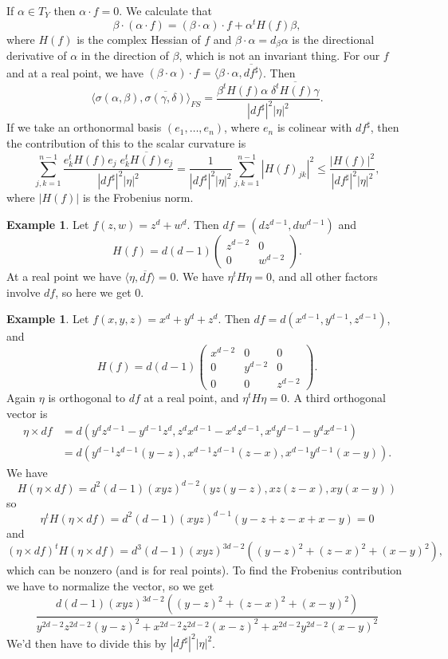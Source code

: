 \documentclass[11pt]{article}
\theoremstyle{definition}
\newtheorem{exam}[theo]{Example}
\def\ov#1{\overline{#1}}
\begin{document}
If $\alpha \in T_{Y}$ then $\alpha \cdot f = 0$. We calculate that
\[
  \beta \cdot (\alpha \cdot f)
  = (\beta \cdot \alpha) \cdot f
  + \alpha^{t} H(f) \beta,
\]
where $H(f)$ is the complex Hessian of $f$ and
$\beta \cdot \alpha = d_{\beta}\alpha$ is the directional derivative of $\alpha$
in the direction of $\beta$, which is not an invariant thing.
For our $f$ and at a real point, we have $(\beta \cdot \alpha) \cdot f = \langle \beta \cdot \alpha, \ov{df^{\sharp}} \rangle$.
Then
\[
  \langle \sigma(\alpha, \beta), \ov{\sigma(\gamma, \delta)} \rangle_{FS}
  = \frac{\beta^{t}H(f)\alpha \; \ov{\delta^{t}H(f)\gamma}}
  {|df^{\sharp}|^{2}|\eta|^{2}}.
\]
If we take an orthonormal basis $(e_{1}, \ldots, e_{n})$, where $e_{n}$ is colinear with $df^{\sharp}$, then the contribution of this to the scalar curvature is
\[
  \sum_{j,k=1}^{n-1} \frac{e_{k}^{t}H(f)e_{j} \; \ov{e_{k}^{t}H(f)e_{j}}}
  {|df^{\sharp}|^{2}|\eta|^{2}}
 = \frac{1}{|df^{\sharp}|^{2}|\eta|^{2}}
 \sum_{j,k=1}^{n-1} |H(f)_{jk}|^{2}
 \leq \frac{|H(f)|^{2}}{|df^{\sharp}|^{2}|\eta|^{2}},
\]
where $|H(f)|$ is the Frobenius norm.


\begin{exam}
Let $f(z,w) = z^{d} + w^{d}$.
Then $df = (dz^{d-1}, dw^{d-1})$ and
\[
H(f) =
d(d-1)
\begin{pmatrix}
z^{d-2} & 0
\\
0 & w^{d-2}
\end{pmatrix}.
\]
At a real point we have $\langle \eta, \ov{df} \rangle = 0$.
We have $\eta^{t}H\eta = 0$, and all other factors involve $df$, so here we get $0$.
\end{exam}



\begin{exam}
Let $f(x,y,z) = x^{d} + y^{d} + z^{d}$.
Then $df = d(x^{d-1}, y^{d-1}, z^{d-1})$, and
\[
H(f) =
d(d-1)
\begin{pmatrix}
x^{d-2} & 0 & 0
\\
0 & y^{d-2} & 0
\\
0 & 0 & z^{d-2}
\end{pmatrix}.
\]
Again $\eta$ is orthogonal to $df$ at a real point, and $\eta^{t}H\eta = 0$.
A third orthogonal vector is
\begin{align*}
  \eta \times df
  &= d(
  y^{d}z^{d-1} - y^{d-1}z^{d} ,
  z^{d}x^{d-1} - x^{d}z^{d-1} ,
  x^{d}y^{d-1} - y^{d}x^{d-1}
  )
  \\
  &= d(
  y^{d-1}z^{d-1}(y - z),
  x^{d-1}z^{d-1}(z - x),
  x^{d-1}y^{d-1}(x - y)
  ).
\end{align*}
We have
\[
  H (\eta \times df)
  = d^{2}(d-1)(xyz)^{d-2}(
  yz(y-z), xz(z-x), xy(x-y)
  )
\]
so
\[
  \eta^{t} H (\eta \times df)
  = d^{2}(d-1)(xyz)^{d-1}
  (y-z + z - x + x - y)
  = 0
\]
and
\[
  (\eta \times df)^{t} H (\eta \times df)
  = d^{3}(d-1) (xyz)^{3d-2}
  (
  (y-z)^{2} + (z-x)^{2} + (x-y)^{2}
  ),
\]
which can be nonzero (and is for real points).
To find the Frobenius contribution we have to normalize the vector, so we get
\[
  \frac{d(d-1) (xyz)^{3d-2}
  (
  (y-z)^{2} + (z-x)^{2} + (x-y)^{2}
  )}{
  y^{2d-2}z^{2d-2}(y-z)^{2}
  + x^{2d-2}z^{2d-2}(x-z)^{2}
  + x^{2d-2}y^{2d-2}(x-y)^{2}
}
\]
We'd then have to divide this by $|df^{\sharp}|^{2}|\eta|^{2}$.
\end{exam}
\end{document}
